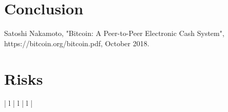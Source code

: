 \documentclass[11pt,a4paper,draft]{article}
\begin{document}
\section{Conclusion}

\newpage
\begin{thebibliography}{9}

Satoshi Nakamoto,
"Bitcoin: A Peer-to-Peer Electronic Cash System",
https://bitcoin.org/bitcoin.pdf,
October 2018.

\end{thebibliography}

\newpage
\appendix

\section{Risks}

\begin{tabular}{| l | l | l |}
  \hline
  \\
  \hline
  \\
  \hline
  \\
  \hline
\end{tabular}
\end{document}
